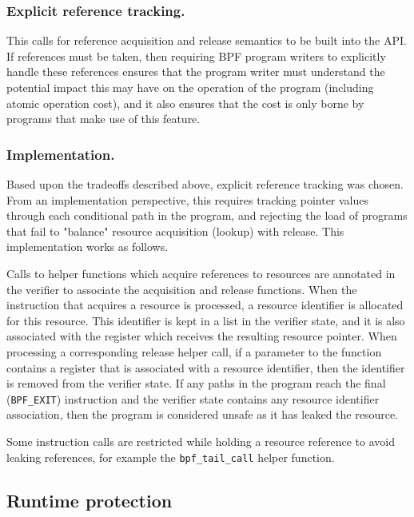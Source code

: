 \documentclass[10pt,sigconf,authorversion]{lpc}
\begin{document}
\subsubsection{Explicit reference tracking.}

This calls for reference acquisition and release semantics to be built into the
API. If references must be taken, then requiring BPF program writers to
explicitly handle these references ensures that the program writer must
understand the potential impact this may have on the operation of the program
(including atomic operation cost), and it also ensures that the cost is only
borne by programs that make use of this feature.

\subsubsection{Implementation.}

Based upon the tradeoffs described above, explicit reference tracking was
chosen. From an implementation perspective, this requires tracking pointer
values through each conditional path in the program, and rejecting the load of
programs that fail to "balance" resource acquisition (lookup) with release.
This implementation works as follows.

Calls to helper functions which acquire references to resources are annotated
in the verifier to associate the acquisition and release functions. When the
instruction that acquires a resource is processed, a resource identifier is
allocated for this resource. This identifier is kept in a list in the verifier
state, and it is also associated with the register which receives the resulting
resource pointer. When processing a corresponding release helper call, if a
parameter to the function contains a register that is associated with a
resource identifier, then the identifier is removed from the verifier state. If
any paths in the program reach the final (\verb+BPF_EXIT+) instruction and the
verifier state contains any resource identifier association, then the program
is considered unsafe as it has leaked the resource.

Some instruction calls are restricted while holding a resource reference to
avoid leaking references, for example the \verb+bpf_tail_call+ helper function.

\subsection{Runtime protection}
\end{document}
